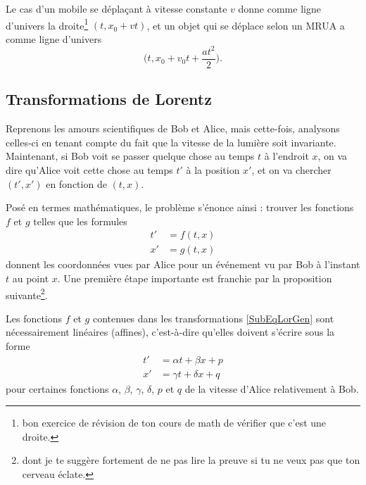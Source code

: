 Le cas d'un mobile se déplaçant à vitesse constante $v$ donne comme ligne d'univers la droite\footnote{bon exercice de révision de ton cours de math de vérifier que c'est une droite.} $(t,x_0+vt)$, et un objet qui se déplace selon un MRUA a comme ligne d'univers
\[
  \big( t, x_0+v_0t+\frac{ at^2 }{ 2 } \big).
\]

\subsection{Transformations de Lorentz}

Reprenons les amours scientifiques de Bob et Alice, mais cette-fois, analysons celles-ci en tenant compte du fait que la vitesse de la lumière soit invariante. Maintenant, si Bob voit se passer quelque chose au temps $t$ à l'endroit $x$, on va dire qu'Alice voit cette chose au temps $t'$ à la position $x'$, et on va chercher $(t',x')$ en fonction de $(t,x)$.

Posé en termes mathématiques, le problème s'énonce ainsi : trouver les fonctions $f$ et $g$ telles que les formules
\begin{subequations}	\label{SubEqLorGen}
\begin{align}
	t'&=f(t,x)\\
	x'&=g(t,x)
\end{align}
\end{subequations}
donnent les coordonnées vues par Alice pour un événement vu par Bob à l'instant $t$ au point $x$. Une première étape importante est franchie par la proposition suivante\footnote{dont je te suggère fortement de ne pas lire la preuve si tu ne veux pas que ton cerveau éclate.}.

\begin{proposition}
Les fonctions $f$ et $g$ contenues dans les transformations \eqref{SubEqLorGen} sont nécessairement linéaires (affines), c'est-à-dire qu'elles doivent s'écrire sous la forme
\[
\begin{split}
t'&=\alpha t+\beta x+p	\\
x'&=\gamma t+\delta x+q
\end{split}
\]
pour certaines fonctions $\alpha$, $\beta$, $\gamma$, $\delta$, $p$ et $q$ de la vitesse d'Alice relativement à Bob.
\end{proposition}

